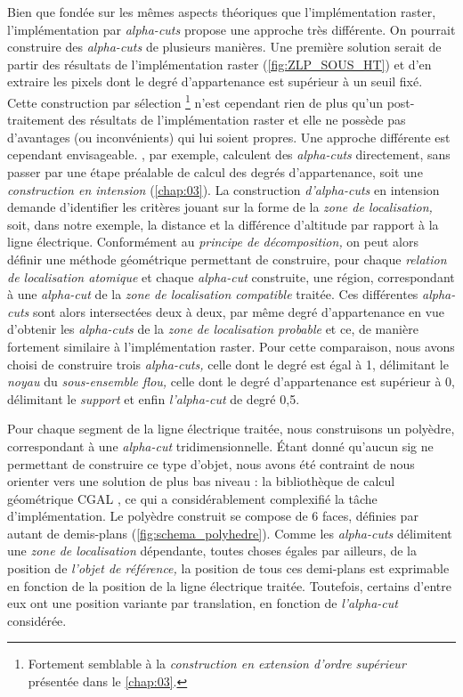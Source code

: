 Bien que fondée sur les mêmes aspects théoriques que l'implémentation
raster, l'implémentation par \emph{alpha-cuts} propose une approche
très différente. On pourrait construire des \emph{alpha-cuts} de
plusieurs manières. Une première solution serait de partir des
résultats de l'implémentation raster (\autoref{fig:ZLP_SOUS_HT}) et
d'en extraire les pixels dont le degré d'appartenance est supérieur à
un seuil fixé. Cette construction par sélection \footnote{Fortement
  semblable à la \emph{construction en extension d'ordre supérieur}
  présentée dans le \autoref{chap:03}.} n'est cependant rien de plus
qu'un post-traitement des résultats de l'implémentation raster et elle
ne possède pas d'avantages (ou inconvénients) qui lui soient
propres. Une approche différente est cependant
envisageable. \textcite{Runz2008a, Zoghlami2016}, par exemple,
calculent des \emph{alpha-cuts} directement, sans passer par une étape
préalable de calcul des degrés d'appartenance, soit une
\emph{construction en intension} (\autoref{chap:03}). La construction
\emph{d'alpha-cuts} en intension demande d'identifier les critères
jouant sur la forme de la \emph{zone de localisation,} soit, dans
notre exemple, la distance et la différence d'altitude par rapport à
la ligne électrique. Conformément au \emph{principe de décomposition,}
on peut alors définir une méthode géométrique permettant de
construire, pour chaque \emph{relation de localisation atomique} et
chaque \emph{alpha-cut} construite, une région, correspondant à une
\emph{alpha-cut} de la \emph{zone de localisation compatible}
traitée. Ces différentes \emph{alpha-cuts} sont alors intersectées
deux à deux, par même degré d'appartenance en vue d'obtenir les
\emph{alpha-cuts} de la \emph{zone de localisation probable} et ce, de
manière fortement similaire à l'implémentation raster. Pour cette
comparaison, nous avons choisi de construire trois \emph{alpha-cuts,}
celle dont le degré est égal à 1, délimitant le \emph{noyau} du
\emph{sous-ensemble flou,} celle dont le degré d'appartenance est
supérieur à 0, délimitant le \emph{support} et enfin
\emph{l'alpha-cut} de degré 0,5.

Pour chaque segment de la ligne électrique traitée, nous construisons
un polyèdre, correspondant à une \emph{alpha-cut}
tridimensionnelle. Étant donné qu'aucun \ac{sig} ne permettant de
construire ce type d'objet, nous avons été contraint de nous orienter
vers une solution de plus bas niveau : la bibliothèque de calcul
géométrique CGAL \autocite{CGAL2019}, ce qui a considérablement
complexifié la tâche d'implémentation. Le polyèdre construit se
compose de 6 faces, définies par autant de demis-plans
(\autoref{fig:schema_polyhedre}). Comme les \emph{alpha-cuts}
délimitent une \emph{zone de localisation} dépendante, toutes choses
égales par ailleurs, de la position de \emph{l'objet de référence,} la
position de tous ces demi-plans est exprimable en fonction de la
position de la ligne électrique traitée. Toutefois, certains d'entre
eux ont une position variante par translation, en fonction de
\emph{l'alpha-cut} considérée.

